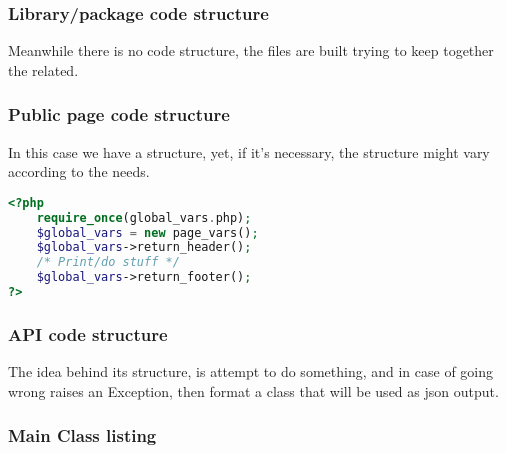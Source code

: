 \subsubsection[Library/package code structure]{Library/package code structure}
\begin{flushleft}
    Meanwhile there is no code structure, the files are built trying to keep together the related.
\end{flushleft}

\subsubsection[Public page code structure]{Public page code structure}
\begin{flushleft}
    In this case we have a structure, yet, if it's necessary, the structure might vary according to the needs.
\end{flushleft}
\begin{flushleft}
\begin{lstlisting}[language=php,label={lst:php_page_structure}]
<?php
    require_once(global_vars.php);
    $global_vars = new page_vars();
    $global_vars->return_header();
    /* Print/do stuff */
    $global_vars->return_footer();
?>
\end{lstlisting}
\end{flushleft}

\newpage
\subsubsection[API code structure]{API code structure}
\begin{flushleft}
    The idea behind its structure, is attempt to do something, and in case of going wrong raises an Exception, then format a class that will be used as json output.
\end{flushleft}


\newpage
\subsubsection[Main Class listing]{Main Class listing}

